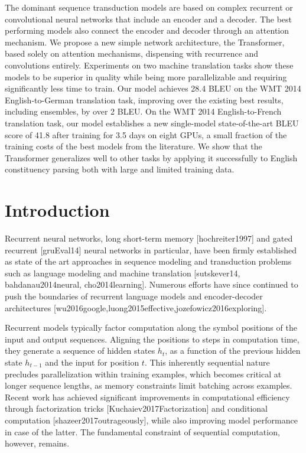\documentclass[11pt,a4paper]{article}
\begin{document}
The dominant sequence transduction models are based on complex recurrent or convolutional neural networks that include an encoder and a decoder. The best performing models also connect the encoder and decoder through an attention mechanism. We propose a new simple network architecture, the Transformer, based solely on attention mechanisms, dispensing with recurrence and convolutions entirely. Experiments on two machine translation tasks show these models to be superior in quality while being  more parallelizable and requiring significantly less time to train. Our model achieves 28.4 BLEU on the WMT 2014 English-to-German translation task, improving over the existing best results, including ensembles, by over 2 BLEU.  On the WMT 2014 English-to-French translation task, our model establishes a new single-model state-of-the-art BLEU score of 41.8 after training for 3.5 days on eight GPUs, a small fraction of the training costs of the best models from the literature. We show that the Transformer generalizes well to other tasks by applying it successfully to English constituency parsing  both with large and limited training data.

\section{Introduction}

Recurrent neural networks, long short-term memory [hochreiter1997] and gated recurrent [gruEval14] neural networks in particular, have been firmly established as state of the art approaches in sequence modeling and transduction problems such as language modeling and machine translation [sutskever14, bahdanau2014neural, cho2014learning]. Numerous efforts have since continued to push the boundaries of recurrent language models and encoder-decoder architectures [wu2016google,luong2015effective,jozefowicz2016exploring].

Recurrent models typically factor computation along the symbol positions of the input and output sequences. Aligning the positions to steps in computation time, they generate a sequence of hidden states $h_t$, as a function of the previous hidden state $h_{t-1}$ and the input for position $t$. This inherently sequential nature precludes parallelization within training examples, which becomes critical at longer sequence lengths, as memory constraints limit batching across examples. Recent work has achieved significant improvements in computational efficiency through factorization tricks [Kuchaiev2017Factorization] and conditional computation [shazeer2017outrageously], while also improving model performance in case of the latter. The fundamental constraint of sequential computation, however, remains.
\end{document}
